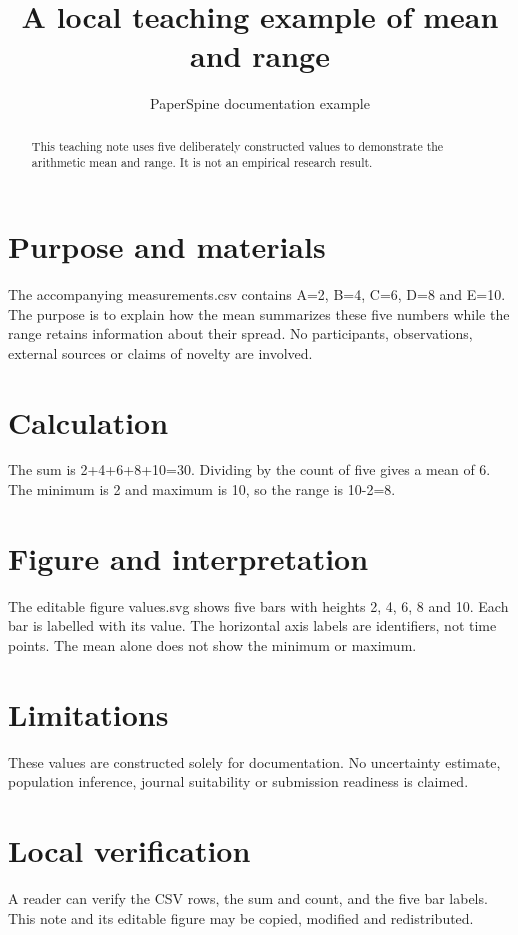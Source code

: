 \documentclass{article}
\title{A local teaching example of mean and range}
\author{PaperSpine documentation example}
\date{}
\begin{document}
\maketitle
\begin{abstract}
This teaching note uses five deliberately constructed values to demonstrate
the arithmetic mean and range. It is not an empirical research result.
\end{abstract}
\section{Purpose and materials}
The accompanying measurements.csv contains A=2, B=4, C=6, D=8 and E=10.
The purpose is to explain how the mean summarizes these five numbers while
the range retains information about their spread. No participants, observations,
external sources or claims of novelty are involved.
\section{Calculation}
The sum is 2+4+6+8+10=30. Dividing by the count of five gives a mean of 6.
The minimum is 2 and maximum is 10, so the range is 10-2=8.
\section{Figure and interpretation}
The editable figure values.svg shows five bars with heights 2, 4, 6, 8 and 10.
Each bar is labelled with its value. The horizontal axis labels are identifiers,
not time points. The mean alone does not show the minimum or maximum.
\section{Limitations}
These values are constructed solely for documentation. No uncertainty estimate,
population inference, journal suitability or submission readiness is claimed.
\section{Local verification}
A reader can verify the CSV rows, the sum and count, and the five bar labels.
This note and its editable figure may be copied, modified and redistributed.
\end{document}

